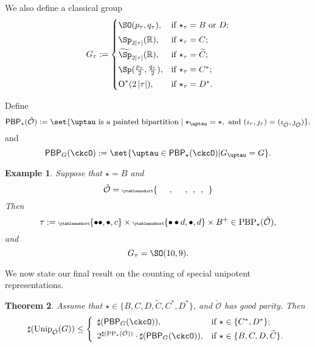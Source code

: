 \documentclass[12pt,a4paper]{amsart}
\let\ytb=\ytableaushort
\newcommand{\tytb}[1]{{\tiny\ytb{#1}}}
\def\abs#1{\left|{#1}\right|}
\newcommand{\CO}{{\mathcal {O}}}
\newcommand{\oO}{\operatorname{O}}
\newcommand{\R}{\mathbb R}
\numberwithin{equation}{section}
\newtheorem{thm}{Theorem}[section]
\newtheorem{eg}[thm]{Example}
\theoremstyle{remark}
\def\Unip{\mathrm{Unip}}
\def\CPPs{\mathrm{PP}_{\star}}
\def\PBP{\mathsf{PBP}}
\begin{document}
We also define a classical group
\begin{equation*}%
  G_\tau:=
  \begin{cases}
    \SO(p_\tau, q_\tau), &\hbox{if $\star_\tau=B$ or $D$}; \smallskip\\
    \Sp_{2\abs{\tau}}(\R), &\hbox{if $\star_\tau=C$}; \smallskip\\
    \widetilde{\Sp}_{2\abs{\tau}}(\R), &\hbox{if $\star_\tau=\widetilde{ C}$}; \smallskip \\
    \Sp(\frac{p_\tau}{2}, \frac{q_\tau}{2}), &\hbox{if $\star_\tau=C^*$}; \smallskip \\
    \oO^*(2\abs{\tau}), &\hbox{if $\star_\tau=D^*$}.\\
  \end{cases}
\end{equation*}


Define
\begin{equation}\label{defpbp2222}
  \PBP_\star(\check \CO) :=\set{ \uptau\textrm{ is a painted
      bipartition} \mid \star_\uptau = \star, \text{ and
    } (\imath_\tau,\jmath_\tau) = (\imath_{\check \CO}, \jmath_{\check \CO})},
\end{equation}
and
\begin{equation*} %
    \PBP_{G}(\ckcO) :=\set{\uptau\in \PBP_{\star}(\ckcO)| G_{\uptau} = G}.
\end{equation*}

\delete{
  \[
    \begin{array}{rl}
      \mathrm{PBP}_\star(\check \CO):=\{ &
                                           \tau\textrm{ is a painted bipartition}  \mid    \star_\tau = \star,
                                           \text{ and } \\  & (\imath_\tau,\jmath_\tau) = (\imath_{\check \CO}, \jmath_{\check \CO})\}.
    \end{array}
  \]
}


\begin{eg} Suppose that $\star=B$ and
  \[
    \check \CO =\tytb{\ \ \ \ \ \ , \ \ \ \ \ \ , \ \ , \ \ , \ \ }
  \]
  Then
  \[
    \tau:= \tytb{\bullet \bullet ,\bullet , c } \times \tytb{\bullet \bullet d ,\bullet , d }\times B^+\in \mathrm{PBP}_{\star}(\check \CO),
  \]
  and
  \[
    G_\tau=\SO(10,9).
  \]
\end{eg}


We now state our final result on the counting of special unipotent representations.


\begin{thm}\label{countup}
  Assume that $\star\in \{B, C,D,\widetilde {C}, C^*, D^*\}$, and $\check \CO$ has good parity. Then
 \[
   \sharp(\Unip_{\check \CO}(G)) \leq
    \left\{
    \begin{array}{ll}
       \sharp (\PBP_{G}(\ckcO)),  & \hbox{if $\star\in \{C^*,D^*\}$}; \smallskip\\
       2^{\sharp(\CPPs(\check \CO))} \cdot \sharp (\PBP_{G}(\ckcO)),  &\hbox{if $\star\in \{B, C,D,\widetilde {C}\}$}.
    \end{array}
  \right.
  \]
\end{thm}
\end{document}
